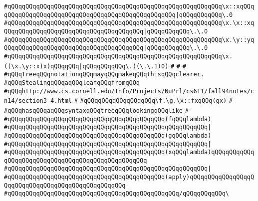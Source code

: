 \verb|#qQQqqQQqqQQqqQQqqQQqqQQqqQQqqQQqqQQqqQQqqQQqqQQqqQQqqQQqqQQq\x::xqQQqqQQqqQQqqQQqqQQqqQQqqQQqqQQqqQQqqQQqqQQqqQQqqQQq|\verb#|qQQqqQQqqQQq\.0#\newline
\verb|#qQQqqQQqqQQqqQQqqQQqqQQqqQQqqQQqqQQqqQQqqQQqqQQqqQQqqQQqqQQq\x.\x::xqQQqqQQqqQQqqQQqqQQqqQQqqQQqqQQqqQQqqQQq|\verb#|qQQqqQQqqQQq\.\.0#\newline
\verb|#qQQqqQQqqQQqqQQqqQQqqQQqqQQqqQQqqQQqqQQqqQQqqQQqqQQqqQQqqQQq\x.\y::yqQQqqQQqqQQqqQQqqQQqqQQqqQQqqQQqqQQqqQQq|\verb#|qQQqqQQqqQQq\.\.0#\newline
\verb|#qQQqqQQqqQQqqQQqqQQqqQQqqQQqqQQqqQQqqQQqqQQqqQQqqQQqqQQqqQQq\x.((\x.\y::x)x)qQQqqQQq|\verb#|qQQqqQQqqQQq\.((\.\.1)0)#\newline
\verb|#|\newline
\verb|#|\newline
\verb|#|\newline
\verb|#qQQqTreeqQQqnotationqQQqmayqQQqmakeqQQqthisqQQqclearer.|\newline
\verb|#qQQqStealingqQQqaqQQqleafqQQqfromqQQq|\newline
\verb|#qQQqhttp://www.cs.cornell.edu/Info/Projects/NuPrl/cs611/fall94notes/cn14/section3_4.html|\newline
\verb|#|\newline
\verb|#qQQqqQQqqQQqqQQqqQQq\f.\g.\x::fxqQQq(gx)|\newline
\verb|#|\newline
\verb|#qQQqhasqQQqaqQQqsyntaxqQQqtreeqQQqlookingqQQqlike|\newline
\verb|#|\newline
\verb|#qQQqqQQqqQQqqQQqqQQqqQQqqQQqqQQqqQQqqQQqqQQq(fqQQqlambda)|\newline
\verb|#qQQqqQQqqQQqqQQqqQQqqQQqqQQqqQQqqQQqqQQqqQQqqQQqqQQqqQQq|\verb#|#\newline
\verb|#qQQqqQQqqQQqqQQqqQQqqQQqqQQqqQQqqQQqqQQqqQQq(gqQQqlambda)|\newline
\verb|#qQQqqQQqqQQqqQQqqQQqqQQqqQQqqQQqqQQqqQQqqQQqqQQqqQQqqQQq|\verb#|#\newline
\verb|#qQQqqQQqqQQqqQQqqQQqqQQqqQQqqQQqqQQqqQQqqQQq(xqQQqlambda)qQQqqQQqqQQqqQQqqQQqqQQqqQQqqQQqqQQqqQQqqQQqqQQqqQQq|\newline
\verb|#qQQqqQQqqQQqqQQqqQQqqQQqqQQqqQQqqQQqqQQqqQQqqQQqqQQqqQQq|\verb#|#\newline
\verb|#qQQqqQQqqQQqqQQqqQQqqQQqqQQqqQQqqQQqqQQqqQQq(apply)qQQqqQQqqQQqqQQqqQQqqQQqqQQqqQQqqQQqqQQqqQQqqQQqqQQq|\newline
\verb|#qQQqqQQqqQQqqQQqqQQqqQQqqQQqqQQqqQQqqQQqqQQqqQQq/qQQqqQQqqQQq\|\newline
